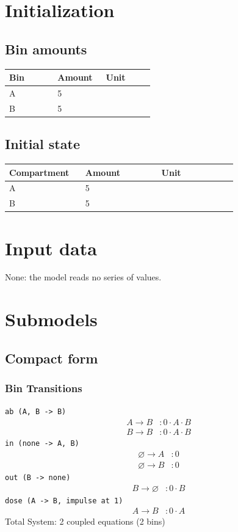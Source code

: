 \documentclass{article}
\begin{document}
\section*{Initialization}
\subsection*{Bin amounts}
\begin{longtable}{p{0.3\linewidth}p{0.3\linewidth}p{0.3\linewidth}}
Bin & Amount & Unit \\
\hline
\endhead
A & 5 &  \\
B & 5 &  \\
\end{longtable}
\subsection*{Initial state}
\begin{longtable}{p{0.3\linewidth}p{0.3\linewidth}p{0.3\linewidth}}
Compartment & Amount & Unit \\
\hline
\endhead
A & 5 &  \\
B & 5 &  \\
\end{longtable}
\section*{Input data}
None: the model reads no series of values.

\section*{Submodels}
\subsection*{Compact form}
\subsubsection*{Bin Transitions}
\noindent\texttt{ab (A, B -\textgreater{} B)}
\begin{align*}
A \to B &: 0 \cdot A \cdot B \\
B \to B &: 0 \cdot A \cdot B
\end{align*}
\noindent\texttt{in (none -\textgreater{} A, B)}
\begin{align*}
\varnothing \to A &: 0 \\
\varnothing \to B &: 0
\end{align*}
\noindent\texttt{out (B -\textgreater{} none)}
\begin{align*}
B \to \varnothing &: 0 \cdot B
\end{align*}
\noindent\texttt{dose (A -\textgreater{} B, impulse at 1)}
\begin{align*}
A \to B &: 0 \cdot A
\end{align*}
Total System: 2 coupled equations (2 bins)
\end{document}
